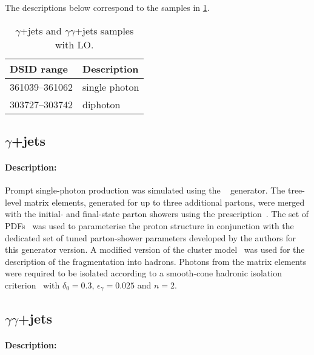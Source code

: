 The descriptions below correspond to the samples in \cref{tab:gammajets-sherpa-lo}.

\begin{table}[!htbp]
  \caption{$\gamma$+jets and  $\gamma\gamma$+jets samples with \SHERPA LO\@.}%
  \label{tab:gammajets-sherpa-lo}
  \centering
  \begin{tabular}{l l}
    \toprule
    DSID range & Description \\
    \midrule
    361039--361062 & single photon \\
    303727--303742 & diphoton \\
    \bottomrule
  \end{tabular}
\end{table}


\subsection[y+jets]{$\gamma$+jets}

\paragraph{Description:}

Prompt single-photon production was simulated using the \SHERPA[2.1]~\cite{Bothmann:2019yzt}
generator. The tree-level matrix elements, generated for up to three
additional partons, were merged with the initial- and final-state parton showers using the
\MEPSatLO prescription~\cite{Hoeche:2009rj}. The \CT[10nlo] set of PDFs~\cite{Lai:2010vv} was
used to parameterise the proton structure in conjunction with the dedicated set of tuned
parton-shower parameters developed by the \SHERPA authors for this generator version. A
modified version of the cluster model~\cite{Winter:2003tt} was used
for the description of the fragmentation into hadrons. Photons from the matrix elements were
required to be isolated according to a smooth-cone hadronic isolation criterion~\cite{Frixione:1998jh}
with $\delta_0=0.3$, $\epsilon_{\gamma}=0.025$ and $n=2$.


\subsection[yy+jets]{ $\gamma\gamma$+jets}

\paragraph{Description:}


